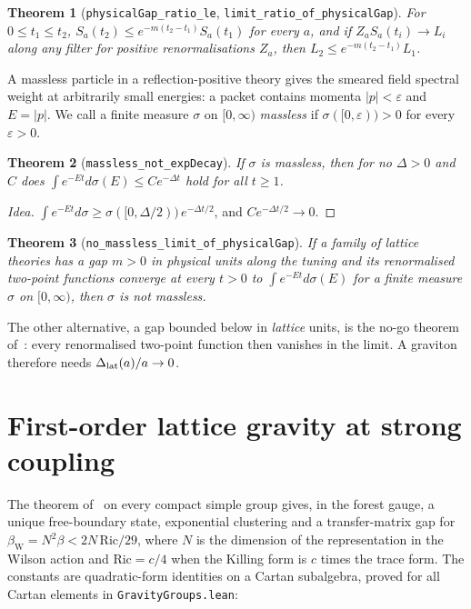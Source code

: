 \documentclass[aps,prd,twocolumn,superscriptaddress,nofootinbib]{revtex4-2}
\newtheorem{theorem}{Theorem}
\theoremstyle{remark}
\newcommand{\bW}{\beta_{\mathrm W}}
\begin{document}
\begin{theorem}[\texttt{physicalGap\_ratio\_le}, \texttt{limit\_ratio\_of\_physicalGap}]
For $0\le t_1\le t_2$, $S_a(t_2)\le e^{-m(t_2-t_1)}S_a(t_1)$ for every $a$, and if $Z_aS_a(t_i)\to L_i$ along any
filter for positive renormalisations $Z_a$, then $L_2\le e^{-m(t_2-t_1)}L_1$.
\end{theorem}

A massless particle in a reflection-positive theory gives the smeared field spectral weight at arbitrarily small
energies: a packet contains momenta $|p|<\varepsilon$ and $E=|p|$. We call a finite measure $\sigma$ on $[0,\infty)$
\emph{massless} if $\sigma([0,\varepsilon))>0$ for every $\varepsilon>0$.

\begin{theorem}[\texttt{massless\_not\_expDecay}]
If $\sigma$ is massless, then for no $\Delta>0$ and $C$ does $\int e^{-Et}d\sigma(E)\le Ce^{-\Delta t}$ hold for
all $t\ge1$.
\end{theorem}

\begin{proof}[Idea]
$\int e^{-Et}d\sigma\ge\sigma([0,\Delta/2))\,e^{-\Delta t/2}$, and $Ce^{-\Delta t/2}\to0$.
\end{proof}

\begin{theorem}[\texttt{no\_massless\_limit\_of\_physicalGap}]\label{thm:nograv}
If a family of lattice theories has a gap $m>0$ in physical units along the tuning and its renormalised two-point
functions converge at every $t>0$ to $\int e^{-Et}d\sigma(E)$ for a finite measure $\sigma$ on $[0,\infty)$, then
$\sigma$ is not massless.
\end{theorem}

The other alternative, a gap bounded below in \emph{lattice} units, is the no-go theorem of~\cite{4YM}: every
renormalised two-point function then vanishes in the limit. A graviton therefore needs $\Delta_{\rm lat}(a)/a\to0$.

\section{First-order lattice gravity at strong coupling}

The theorem of~\cite{4YM} on every compact simple group gives, in the forest gauge, a unique free-boundary state,
exponential clustering and a transfer-matrix gap for $\bW=N^2\beta<2N\,\mathrm{Ric}/29$, where $N$ is the dimension
of the representation in the Wilson action and $\mathrm{Ric}=c/4$ when the Killing form is $c$ times the trace form.
The constants are quadratic-form identities on a Cartan subalgebra, proved for all Cartan elements in
\texttt{GravityGroups.lean}:
\end{document}
